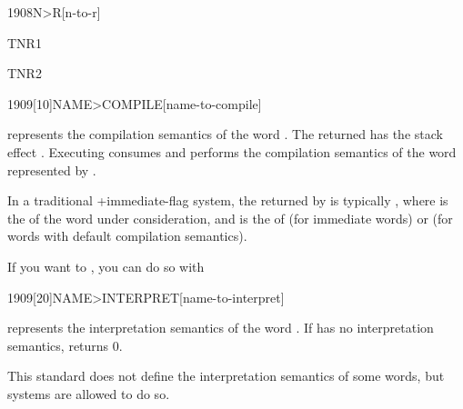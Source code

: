\begin{worddef}[NtoR]{1908}{N>R}[n-to-r]
	\begin{testing} %
		\word{:} TNR1    \word{;} \\

		\word{:} TNR2      \word{;} \\
	\end{testing}
\end{worddef}

\vspace*{-2.5ex}
\begin{worddef}[NAMEtoCOMPILE]{1909}[10]{NAME>COMPILE}[name-to-compile]%
\item {}

	 represents the compilation semantics of the word
	.  The returned  has the stack effect
	.  Executing  consumes
	 and performs the compilation semantics of the word
	represented by .


	\begin{rationale}
		In a traditional +immediate-flag system, the
		 returned by  is
		typically , where  is the
		 of the word under consideration, and
		 is the  of 
		(for immediate words) or  (for words
		with default compilation semantics).

		If you want to  , you can
		do so with

		\begin{quote}\ttfamily
			  
			 
		\end{quote}
  	\end{rationale} 
\end{worddef}

\vspace*{-2.5ex}
\begin{worddef}[NAMEtoINTERPRET]{1909}[20]{NAME>INTERPRET}[name-to-interpret]%
\item {}

	 represents the interpretation semantics of the word
	.  If  has no interpretation semantics,
	 returns 0.

\note
	This standard does not define the interpretation semantics of
	some words, but systems are allowed to do so.
 
\end{worddef}

